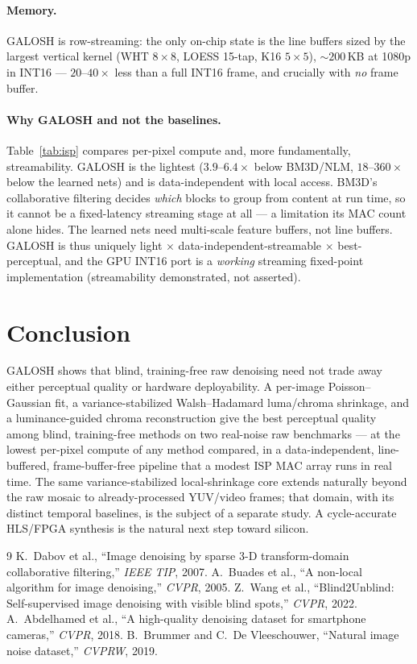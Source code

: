 \documentclass[10pt,twocolumn]{article}
\begin{document}
\paragraph{Memory.} GALOSH is row-streaming: the only on-chip state is the line
buffers sized by the largest vertical kernel (WHT $8{\times}8$, LOESS 15-tap, K16
$5{\times}5$), $\sim\!200$\,KB at 1080p in INT16 --- $20$--$40\times$ less than a
full INT16 frame, and crucially with \emph{no} frame buffer.

\paragraph{Why GALOSH and not the baselines.} Table~\ref{tab:isp} compares
per-pixel compute and, more fundamentally, streamability. GALOSH is the lightest
($3.9$--$6.4\times$ below BM3D/NLM, $18$--$360\times$ below the learned nets) and
is data-independent with local access. BM3D's collaborative filtering decides
\emph{which} blocks to group from content at run time, so it cannot be a
fixed-latency streaming stage at all --- a limitation its MAC count alone hides.
The learned nets need multi-scale feature buffers, not line buffers. GALOSH is
thus uniquely light $\times$ data-independent-streamable $\times$ best-perceptual,
and the GPU INT16 port is a \emph{working} streaming fixed-point implementation
(streamability demonstrated, not asserted).



\section{Conclusion}
GALOSH shows that blind, training-free raw denoising need not trade away either
perceptual quality or hardware deployability. A per-image Poisson--Gaussian fit, a
variance-stabilized Walsh--Hadamard luma/chroma shrinkage, and a luminance-guided
chroma reconstruction give the best perceptual quality among blind, training-free
methods on two real-noise raw benchmarks --- at the lowest per-pixel compute of any
method compared, in a data-independent, line-buffered, frame-buffer-free pipeline
that a modest ISP MAC array runs in real time. The same variance-stabilized
local-shrinkage core extends naturally beyond the raw mosaic to already-processed
YUV/video frames; that domain, with its distinct temporal baselines, is the
subject of a separate study. A cycle-accurate HLS/FPGA synthesis is the natural
next step toward silicon.

\begin{thebibliography}{9}\small
{} K.\ Dabov et al., ``Image denoising by sparse 3-D transform-domain
collaborative filtering,'' \emph{IEEE TIP}, 2007.
 A.\ Buades et al., ``A non-local algorithm for image denoising,''
\emph{CVPR}, 2005.
 Z.\ Wang et al., ``Blind2Unblind: Self-supervised image denoising
with visible blind spots,'' \emph{CVPR}, 2022.
 A.\ Abdelhamed et al., ``A high-quality denoising dataset for
smartphone cameras,'' \emph{CVPR}, 2018.
 B.\ Brummer and C.\ De Vleeschouwer, ``Natural image noise
dataset,'' \emph{CVPRW}, 2019.
\end{thebibliography}
\end{document}
